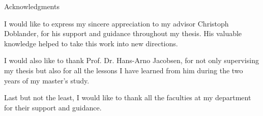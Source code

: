 
\thispagestyle{empty}
\setlength{\parskip}{1em}
\setlength\parindent{0pt}
\vspace*{2cm}

\begin{center}
{ Acknowledgments}
\end{center}
\vspace{1cm}

I would like to express my sincere appreciation to my advisor Christoph Doblander, for his support and guidance throughout my thesis. His valuable knowledge helped to take this work into new directions.

I would also like to thank Prof. Dr. Hans-Arno Jacobsen, for not only supervising my thesis but also for all the lessons I have learned from him during the two years of my master's study.

Last but not the least, I would like to thank all the faculties at my department for their support and guidance.

\cleardoublepage{}
